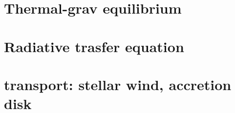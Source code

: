 \section{Thermal-grav equilibrium}

\section{Radiative trasfer equation}

\section{transport: stellar wind, accretion disk}